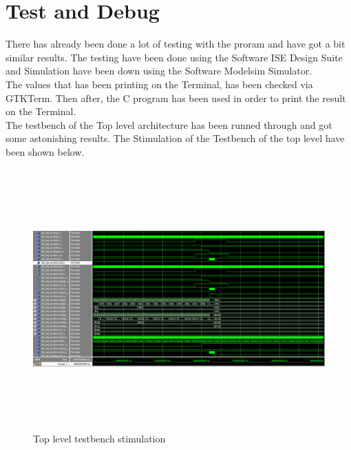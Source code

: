 \documentclass[12pt,a4paper]{article}
\begin{document}
\section{Test and Debug}
There has already been done a lot of testing with the proram and have got a bit similar results. The testing have been done using the Software ISE Design Suite and Simulation have been down using the Software Modelsim Simulator.\\
The values that has been printing on the Terminal, has been checked via GTKTerm. Then after, the C program has been used in order to print the result on the Terminal.\\
The testbench of the Top level architecture has been runned through and got some astonishing results. The Stimulation of the Testbench of the top level have been shown below.\\
\begin{figure}[H]
\centering
\includegraphics[width=16cm,height=10cm]{topleveltestbench.PNG}
\caption{Top level testbench stimulation}
\label{Top level testbench stimulation}
\end{figure}
\end{document}
